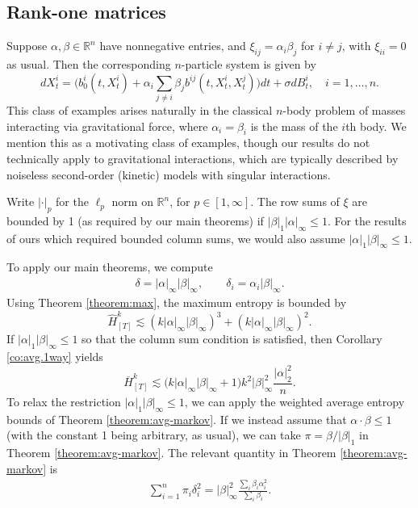 \documentclass[11pt,reqno]{amsart}
\numberwithin{equation}{section}
\theoremstyle{definition}
\def\R{{\mathbb R}}
\begin{document}
\subsection{Rank-one matrices}
 
Suppose  $\alpha,\beta\in\R^n$ have nonnegative entries, and $\xi_{ij}=\alpha_i\beta_j$ for $i \neq j$, with $\xi_{ii}=0$ as usual. Then the corresponding $ n $-particle system is given by
	\begin{equation*}  
	d X^{i}_t = \bigg(b^i_0(t, X^{i}_t) + \alpha_i\sum_{j \neq i}  \beta_j b^{ij}(t, X^{i}_t, X^{j}_t)\bigg) dt + \sigma dB^i_t, \quad i = 1, \dots ,n.
	\end{equation*}
This class of examples arises naturally in the classical $n$-body problem of masses interacting via gravitational force, where $\alpha_i=\beta_i$ is the mass of the $i$th body. We mention this as a motivating class of examples, though our results do not technically apply to gravitational interactions, which are typically described by  noiseless second-order (kinetic) models with singular interactions.

Write $|\cdot|_p$ for the $\ell_p$ norm on $\R^n$, for $p \in [1,\infty]$. The row sums of $\xi$ are bounded by 1 (as required by our main theorems) if $|\beta|_1|\alpha|_\infty \le 1$. For the results of ours which required bounded column sums, we would also assume $|\alpha|_1|\beta|_\infty \le 1$.

To apply our main theorems, we compute
\begin{align*}
\delta = |\alpha|_\infty |\beta|_\infty  , \qquad \delta_i = \alpha_i |\beta|_\infty. 
\end{align*}
Using Theorem \ref{theorem:max}, the maximum entropy  is bounded by
\begin{equation}
\widehat{H}^k_{[T]} \lesssim  (k |\alpha|_\infty  |\beta|_\infty)^3+  (k |\alpha|_\infty  |\beta|_\infty)^2. \label{ex:rankone-max}
\end{equation}
If $|\alpha|_1|\beta|_\infty \le 1$ so that the column sum condition is satisfied, then Corollary \ref{co:avg.1way} yields
\begin{equation}
\overline{H}^k_{[T]} \lesssim  \big(k|\alpha|_\infty |\beta|_\infty+1\big) k^2 |\beta|_\infty^2 \frac{|\alpha|_2^2}{n}. \label{ex:rankone-avg1}
\end{equation} 
To relax the restriction $|\alpha|_1|\beta|_\infty \le 1$, we can apply the weighted average entropy bounds of Theorem \ref{theorem:avg-markov}. If we instead assume that $\alpha \cdot \beta \le 1$ (with the constant 1 being arbitrary, as usual), we can take $\pi=\beta/|\beta|_1$ in Theorem \ref{theorem:avg-markov}. The relevant quantity in Theorem \ref{theorem:avg-markov} is
\begin{align*}
\sum_{i=1}^n \pi_i\delta_i^2 = |\beta|_\infty^2  \frac{\sum_i\beta_i \alpha_i^2}{\sum_i\beta_i}.
\end{align*}
\end{document}
